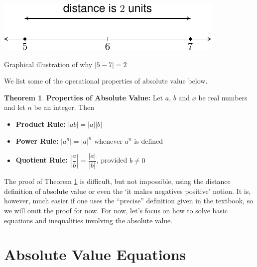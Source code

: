 \documentclass[11pt]{article}
\theoremstyle{definition}  %
\newtheorem{thm}{\bf Theorem}
\newcommand{\bbm}{\begin{boxedminipage}{6.41in}}
\newcommand{\ebm}{\end{boxedminipage}}
\begin{document}
\begin{center}

\includegraphics{AbsValEqIneq-2}

Graphical illustration of why $|5-7| = 2$

\end{center}

We list some of the operational properties of absolute value below.

\medskip

\colorbox{ResultColor}{\bbm
\begin{thm}  \textbf{Properties of Absolute Value:} Let $a$, $b$ and $x$ be real numbers and let $n$ be an integer. Then \label{absolutevalueprops} 

\begin{itemize}

\item {\bf Product Rule:} $|ab|= |a||b|$ 

\item {\bf Power Rule:} $\left| a^{n} \right| = |a|^{n}$ whenever $a^{n}$ is defined 

\item {\bf Quotient Rule:} $\left| \dfrac{a}{b} \right| = \dfrac{|a|}{|b|}$, provided $b \neq 0$ 

\end{itemize}

\end{thm}

\ebm}

\medskip

The proof of Theorem \ref{absolutevalueprops} is difficult, but not impossible, using the distance definition of absolute value or even the `it makes negatives positive' notion.  It is, however, much easier if one uses the ``precise'' definition given in the textbook, so we will omit the proof for now. For now, let's focus on how to solve basic equations and inequalities involving the absolute value.

\section{Absolute Value Equations}
\label{basicabsvaleqns}
\end{document}
